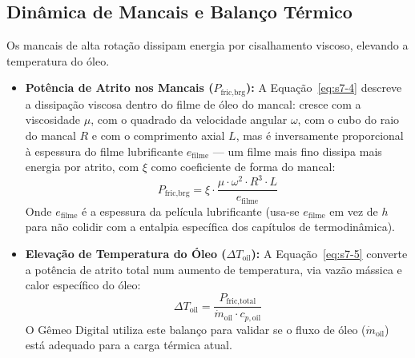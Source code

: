 \documentclass[12pt,a4paper]{article}
\numberwithin{equation}{section}
\numberwithin{table}{section}
\numberwithin{figure}{section}
\begin{document}
	\subsection{\textbf{Dinâmica de Mancais e Balanço Térmico}}
	Os mancais de alta rotação dissipam energia por cisalhamento viscoso, elevando a temperatura do óleo.
	\begin{itemize}
		\item \textbf{Potência de Atrito nos Mancais ($P_{\text{fric,brg}}$):} A Equação~\eqref{eq:s7-4} descreve a dissipação viscosa dentro do filme de óleo do mancal: cresce com a viscosidade $\mu$, com o quadrado da velocidade angular $\omega$, com o cubo do raio do mancal $R$ e com o comprimento axial $L$, mas é inversamente proporcional à espessura do filme lubrificante $e_{\text{filme}}$ — um filme mais fino dissipa mais energia por atrito, com $\xi$ como coeficiente de forma do mancal:
		\begin{equation}\label{eq:s7-4}
 P_{\text{fric,brg}} = \xi \cdot \frac{\mu \cdot \omega^2 \cdot R^3 \cdot L}{e_{\text{filme}}}
\end{equation}
		Onde $e_{\text{filme}}$ é a espessura da película lubrificante (usa-se $e_{\text{filme}}$ em vez de $h$ para não colidir com a entalpia específica dos capítulos de termodinâmica).
		\item \textbf{Elevação de Temperatura do Óleo ($\Delta T_{\text{oil}}$):} A Equação~\eqref{eq:s7-5} converte a potência de atrito total num aumento de temperatura, via vazão mássica e calor específico do óleo:
		\begin{equation}\label{eq:s7-5}
 \Delta T_{\text{oil}} = \frac{P_{\text{fric,total}}}{\dot{m}_{\text{oil}} \cdot c_{p,\text{oil}}} 
\end{equation}
		O Gêmeo Digital utiliza este balanço para validar se o fluxo de óleo ($\dot{m}_{\text{oil}}$) está adequado para a carga térmica atual.
	\end{itemize}
	
\end{document}

